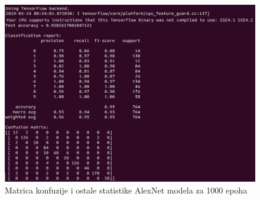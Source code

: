 \documentclass[a4paper]{article}
\begin{document}
\begin{figure}[h!]
\begin{center}
\includegraphics[scale=0.65]{confussion_matrix_alexNet_1000epoh.png}
\end{center}
\caption{Matrica konfuzije i ostale statistike AlexNet modela za 1000 epoha}
\label{fig:alex_net_matrix}
\end{figure}
\end{document}
